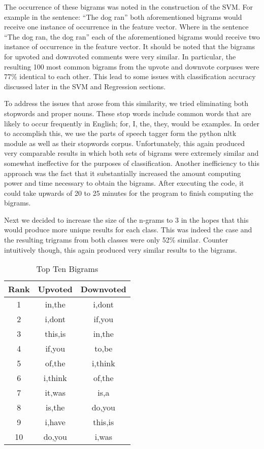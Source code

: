 \documentclass{article}
\begin{document}
The occurrence of these bigrams was noted in the construction of the SVM. For example in the sentence: ``The dog ran'' both aforementioned bigrams would receive one instance of occurrence in the feature vector. Where in the sentence ``The dog ran, the dog ran'' each of the aforementioned bigrams would receive two instance of occurrence in the feature vector. It should be noted that the bigrams for upvoted and downvoted comments were very similar. In particular, the resulting 100 most common bigrams from the upvote and downvote corpuses were 77\% identical to each other.  This lead to some issues with classification accuracy discussed later in the SVM and Regression sections. 


To address the issues that arose from this similarity, we tried eliminating both stopwords and proper nouns. These stop words include common words that are likely to occur frequently in English; for, I, the, they, would be examples. In order to accomplish this, we use the parts of speech tagger form the python nltk module as well as their stopwords corpus. Unfortunately, this again produced very comparable results in which both sets of bigrams were extremely similar and somewhat ineffective for the purposes of classification. Another inefficiency to this approach was the fact that it substantially increased the amount computing power and time necessary to obtain the bigrams. After executing the code, it could take upwards of 20 to 25 minutes for the program to finish computing the bigrams.  


Next we decided to increase the size of the n-grams to 3 in the hopes that this would produce more unique results for each class. This was indeed the case and the resulting trigrams from both classes were only 52\% similar. Counter intuitively though, this again produced very similar results to the bigrams. 
\begin{table}[h]
\centering
\caption{Top Ten Bigrams}
\begin{tabular}{||c c c||}
\hline
Rank & Upvoted & Downvoted\\
\hline\hline
1 & in,the & i,dont\\                                                                              
2 & i,dont & if,you\\
3 & this,is & in,the\\
4 & if,you & to,be\\
5 & of,the & i,think\\
6 & i,think & of,the\\
7 & it,was & is,a\\
8 & is,the & do,you\\
9 & i,have & this,is\\
10 & do,you & i,was\\
\hline
\end{tabular}
\end{table}
\end{document}
